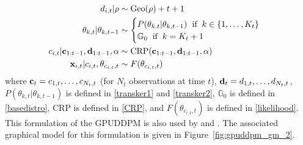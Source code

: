 \documentclass[twocolumn, final]{svjour3}
\begin{document}
\begin{align}
\begin{split}
d_{i,t} | \rho  &\sim \text{Geo}(\rho) + t + 1 \\
\theta_{k, t} | \theta_{k, t-1}  &\sim
\begin{cases}
P(\theta_{k,t} | \theta_{k,t-1}) \hspace{2mm} \text{if} \hspace{2mm} k \in \{ 1, \ldots, K_{t} \} \\
\mathbb{G}_{0} \hspace{2mm} \text{if} \hspace{2mm} k = K_{t} + 1
\end{cases} \\
c_{i,t} | \bold{c}_{1:t-1}, \bold{d}_{1:t-1}, \alpha  &\sim  \text{CRP}(\bold{c}_{1:t-1}, \bold{d}_{1:t-1}, \alpha) \\
\bold{x}_{i,t} | c_{i,t}, \theta_{c_{i,t},t}  &\sim  F(\theta_{c_{i,t}, t})
\end{split}
\end{align}
where $\bold{c}_{t} = c_{1,t}, \ldots, c_{N_{t}, t}$ (for $N_{t}$ observations at time $t$), $\bold{d}_{t} = d_{1,t}, \ldots, d_{N_{t}, t}$, $P(\theta_{k,t} | \theta_{k,t-1})$ is defined in \eqref{transker1} and \eqref{transker2}, $\mathbb{G}_{0}$ is defined in \eqref{basedistro}, CRP is defined in \eqref{CRP}, and $F(\theta_{c_{i,t}, t})$ is defined in \eqref{likelihood}. This formulation of the GPUDDPM is also used by \cite{gasthaus_thesis} and \cite{caron_2007}. The associated graphical model for this formulation is given in Figure~\ref{fig:gpuddpm_gm_2}.
\end{document}
